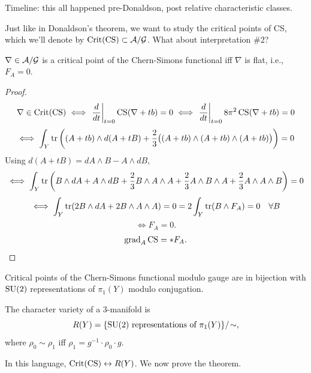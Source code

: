 \documentclass[main]{subfiles}
\begin{document}
\begin{remark}
Timeline: this all happened pre-Donaldson, post relative characteristic classes.
\end{remark}

Just like in Donaldson's theorem, we want to study the critical points of CS, which we'll denote by $\operatorname{Crit}(\operatorname{CS})\subset \mathcal{A}/\mathcal{G}$. What about interpretation \#2?

\begin{theorem}
$\nabla \in \mathcal{A}/\mathcal{G}$ is a critical point of the Chern-Simons functional iff $\nabla$ is flat, i.e., $F_A=0$.
\end{theorem}

\begin{proof}
\[
\nabla \in \operatorname{Crit}(\operatorname{CS}) \iff \left.\frac{d}{dt}\right|_{t=0} \operatorname{CS}(\nabla+tb) = 0 \iff \left.\frac{d}{dt}\right|_{t=0} 8\pi^2\operatorname{CS}(\nabla+tb) = 0
\]
\[
\iff \int_Y \operatorname{tr}\left((A+tb)\wedge d(A+tB) + \frac{2}{3}\big((A+tb)\wedge(A+tb)\wedge(A+tb)\big)\right) = 0
\]
Using $d(A+tB) = dA\wedge B - A\wedge dB$,
\[
\iff \int_Y \operatorname{tr}\left(B\wedge dA + A\wedge dB + \frac{2}{3}B\wedge A\wedge A + \frac{2}{3}A\wedge B\wedge A + \frac{2}{3}A\wedge A\wedge B\right) = 0
\]
\[
\iff \int_Y \operatorname{tr}(2B\wedge dA + 2B\wedge A\wedge A) = 0 = 2\int_Y \operatorname{tr}(B\wedge F_A) = 0 \quad \forall B
\]
\[
\iff F_A = 0.
\]
\[
\operatorname{grad}_A \operatorname{CS} = \ast F_A. \qedhere
\]
\end{proof}

\begin{theorem}\label{thm:crit-cs-su2-reps}
Critical points of the Chern-Simons functional modulo gauge are in bijection with $\operatorname{SU}(2)$ representations of $\pi_1(Y)$ modulo conjugation.
\end{theorem}

\begin{definition}
The character variety of a $3$-manifold is
\[
R(Y) = \{\operatorname{SU}(2) \text{ representations of } \pi_1(Y)\}/\!\sim,
\]
where $\rho_0 \sim \rho_1$ iff $\rho_1 = g^{-1}\cdot \rho_0 \cdot g$.
\end{definition}

In this language, $\operatorname{Crit}(\operatorname{CS}) \leftrightarrow R(Y)$. We now prove the theorem.
\end{document}
